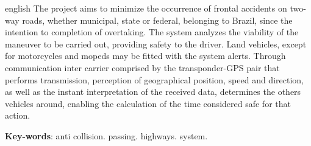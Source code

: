 \begin{resumo}[Abstract]
 \begin{otherlanguage*}{english}
   The project aims to minimize the occurrence of frontal accidents on two-way
   roads, whether municipal, state or federal, belonging to Brazil, since the
   intention to completion of overtaking. The system analyzes the viability of
   the maneuver to be carried out, providing safety to the driver. Land vehicles,
    except for motorcycles and mopeds may be fitted with the system alerts.
    Through communication inter carrier comprised by the transponder-GPS pair
    that performs transmission, perception of geographical position, speed and
    direction, as well as the instant interpretation of the received data,
    determines the others vehicles around, enabling the calculation of the time
    considered safe for that action.


   \vspace{\onelineskip}

   \noindent
   \textbf{Key-words}: anti collision. passing. highways. system.
 \end{otherlanguage*}
\end{resumo}
